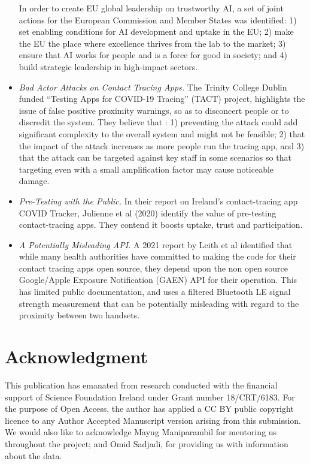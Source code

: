 \documentclass[conference]{IEEEtran}
\begin{document}
\begin{itemize}
In order to create EU global leadership on trustworthy AI, a set of joint actions for the European Commission and Member States was identified: 1) set enabling conditions for AI development and uptake in the EU; 2) make the EU the place where excellence thrives from the lab to the market; 3) ensure that AI works for people and is a force for good in society; and 4) build strategic leadership in high-impact sectors.
\item {\emph{Bad Actor Attacks on Contact Tracing Apps.}}\cite{b5}
The Trinity College Dublin funded “Testing Apps for COVID-19 Tracing” (TACT) project, highlights the issue of false positive proximity warnings, so as to disconcert people or to discredit the system. They believe that : 1) preventing the attack could add significant complexity to the overall system and might not be feasible; 2) that the impact of the attack increases as more people run the tracing app, and 3) that the attack can be targeted against key staff in some scenarios so that targeting even with a small amplification factor may cause noticeable damage.
\item {\emph{Pre-Testing with the Public.}}\cite{b6}
In their report on Ireland’s contact-tracing app COVID Tracker, Julienne et al (2020) identify the value of pre-testing contact-tracing apps. They contend it boosts uptake, trust and participation. 
\item {\emph{A Potentially Misleading API.}}\cite{b7}
A 2021 report by Leith et al identified that while many health authorities have committed to making the code for their contact tracing apps open source, they depend upon the non open source Google/Apple Exposure Notification (GAEN) API for their operation. This has limited public documentation, and uses a filtered Bluetooth LE signal strength measurement that can be potentially misleading with regard to the proximity between two handsets.


\end{itemize}



\section*{Acknowledgment}
This publication has emanated from research conducted with the financial
support of Science Foundation Ireland under Grant number 18/CRT/6183. For the purpose
of Open Access, the author has applied a CC BY public copyright licence to any
Author Accepted Manuscript version arising from this submission.\\
We would also like to acknowledge Mayug Maniparambil for mentoring us throughout the project; and Omid Sadjadi, for providing us with information about the data.
\end{document}
